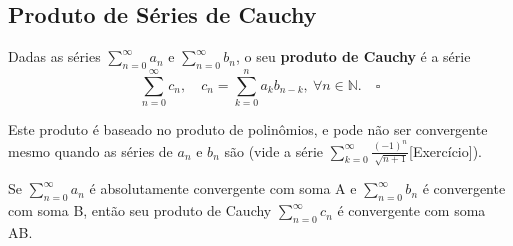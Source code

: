 \documentclass[../analysis_notes.tex]{subfiles}
\begin{document}
\subsection{Produto de Séries de Cauchy}
\begin{def*}
	Dadas as séries \(\sum\limits_{n=0}^{\infty}a_{n}\) e \(\sum\limits_{n=0}^{\infty}b_{n}\), o seu \textbf{produto de Cauchy} é a série
	\[
		\sum\limits_{n=0}^{\infty}c_{n},\quad c_{n}=\sum\limits_{k=0}^{n}a_{k}b_{n-k},\: \forall n\in \mathbb{N}.\quad \square
	\]
\end{def*}
Este produto é baseado no produto de polinômios, e pode não ser convergente mesmo quando as séries de \(a_{n}\) e \(b_{n}\) são (vide a série \(\sum\limits_{k=0}^{\infty}\frac{(-1)^{n}}{\sqrt[]{n+1}}\)[Exercício]).
\begin{theorem*}
	Se \(\sum\limits_{n=0}^{\infty}a_{n}\) é absolutamente convergente com soma A e \(\sum\limits_{n=0}^{\infty}b_{n}\) é convergente com soma B, então seu produto de Cauchy \(\sum\limits_{n=0}^{\infty}c_{n}\) é convergente com soma AB.
\end{theorem*}
\end{document}
